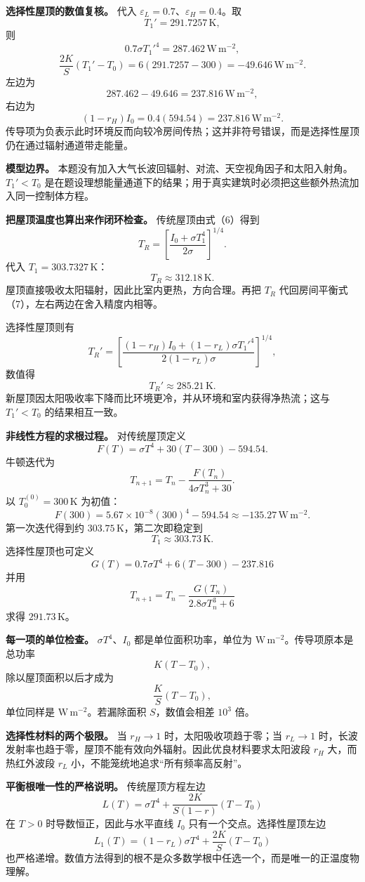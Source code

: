 \documentclass[12pt,a4paper,UTF8]{ctexart}
\begin{document}
\textbf{选择性屋顶的数值复核。} 代入
\(\varepsilon_L=0.7\)、\(\varepsilon_H=0.4\)。取 \[
T_1'=291.7257\,\mathrm K,
\] 则 \[
0.7\sigma T_1'^4
=287.462\,\mathrm{W\,m^{-2}},
\] \[
\frac{2K}{S}(T_1'-T_0)
=6(291.7257-300)
=-49.646\,\mathrm{W\,m^{-2}}.
\] 左边为 \[
287.462-49.646
=237.816\,\mathrm{W\,m^{-2}},
\] 右边为 \[
(1-r_H)I_0=0.4(594.54)
=237.816\,\mathrm{W\,m^{-2}}.
\]
传导项为负表示此时环境反而向较冷房间传热；这并非符号错误，而是选择性屋顶仍在通过辐射通道带走能量。

\textbf{模型边界。}
本题没有加入大气长波回辐射、对流、天空视角因子和太阳入射角。\(T_1'<T_0\)
是在题设理想能量通道下的结果；用于真实建筑时必须把这些额外热流加入同一控制体方程。

\textbf{把屋顶温度也算出来作闭环检查。} 传统屋顶由式（6）得到 \[
T_R=
\left[
\frac{I_0+\sigma T_1^4}{2\sigma}
\right]^{1/4}.
\] 代入 \(T_1=303.7327\,\mathrm K\)： \[
T_R\approx312.18\,\mathrm K.
\] 屋顶直接吸收太阳辐射，因此比室内更热，方向合理。再把 \(T_R\)
代回房间平衡式（7），左右两边在舍入精度内相等。

选择性屋顶则有 \[
T_R'=
\left[
\frac{(1-r_H)I_0+(1-r_L)\sigma T_1'^4}
{2(1-r_L)\sigma}
\right]^{1/4},
\] 数值得 \[
T_R'\approx285.21\,\mathrm K.
\] 新屋顶因太阳吸收率下降而比环境更冷，并从环境和室内获得净热流；这与
\(T_1'<T_0\) 的结果相互一致。

\textbf{非线性方程的求根过程。} 对传统屋顶定义 \[
F(T)=\sigma T^4+30(T-300)-594.54.
\] 牛顿迭代为 \[
T_{n+1}
=T_n-\frac{F(T_n)}{4\sigma T_n^3+30}.
\] 以 \(T_0^{(0)}=300\,\mathrm K\) 为初值： \[
F(300)
=5.67\times10^{-8}(300)^4-594.54
\approx-135.27\,\mathrm{W\,m^{-2}}.
\] 第一次迭代得到约 \(303.75\,\mathrm K\)，第二次即稳定到 \[
T_1\approx303.73\,\mathrm K.
\] 选择性屋顶也可定义 \[
G(T)=0.7\sigma T^4+6(T-300)-237.816
\] 并用 \[
T_{n+1}=T_n-\frac{G(T_n)}{2.8\sigma T_n^3+6}
\] 求得 \(291.73\,\mathrm K\)。

\textbf{每一项的单位检查。} \(\sigma T^4\)、\(I_0\)
都是单位面积功率，单位为 \(\mathrm{W\,m^{-2}}\)。传导项原本是总功率 \[
K(T-T_0),
\] 除以屋顶面积以后才成为 \[
\frac KS(T-T_0),
\] 单位同样是 \(\mathrm{W\,m^{-2}}\)。若漏除面积 \(S\)，数值会相差
\(10^3\) 倍。

\textbf{选择性材料的两个极限。} 当 \(r_H\to1\) 时，太阳吸收项趋于零；当
\(r_L\to1\)
时，长波发射率也趋于零，屋顶不能有效向外辐射。因此优良材料要求太阳波段
\(r_H\) 大，而热红外波段 \(r_L\) 小，不能笼统地追求``所有频率高反射''。

\textbf{平衡根唯一性的严格说明。} 传统屋顶方程左边 \[
L(T)=\sigma T^4+
\frac{2K}{S(1-r)}(T-T_0)
\] 在 \(T>0\) 时导数恒正，因此与水平直线 \(I_0\)
只有一个交点。选择性屋顶左边 \[
L_1(T)=(1-r_L)\sigma T^4+\frac{2K}{S}(T-T_0)
\]
也严格递增。数值方法得到的根不是众多数学根中任选一个，而是唯一的正温度物理解。
\end{document}
